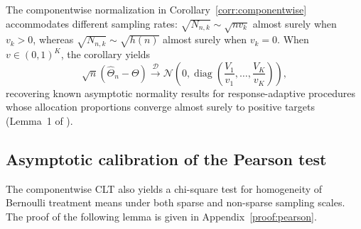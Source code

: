 
{\color{revisiongreen}
\begin{remark}
The componentwise normalization in Corollary~\ref{corr:componentwise} accommodates different sampling rates: \(\sqrt{N_{n,k}}\sim\sqrt{nv_k}\) almost surely when \(v_k>0\), whereas \(\sqrt{N_{n,k}}\sim\sqrt{h(n)}\) almost surely when \(v_k=0\). When \(v\in(0,1)^K\), the corollary yields
\[
\sqrt n(\hat\Theta_n-\Theta)
\xrightarrow{\mathcal D}
\mathcal N\!\left(0,\operatorname{diag}\left(\frac{V_1}{v_1},\ldots,\frac{V_K}{v_K}\right)\right),
\]
recovering known asymptotic normality results for response-adaptive procedures whose allocation proportions converge almost surely to positive targets (Lemma~1 of \cite{hu2006asymptotically}).
\end{remark}
}


{\color{revisiongreen}
\subsection{Asymptotic calibration of the Pearson test}
The componentwise CLT also yields a chi-square test for homogeneity of Bernoulli treatment means under both sparse and non-sparse sampling scales. The proof of the following lemma is given in Appendix~\ref{proof:pearson}.
}


